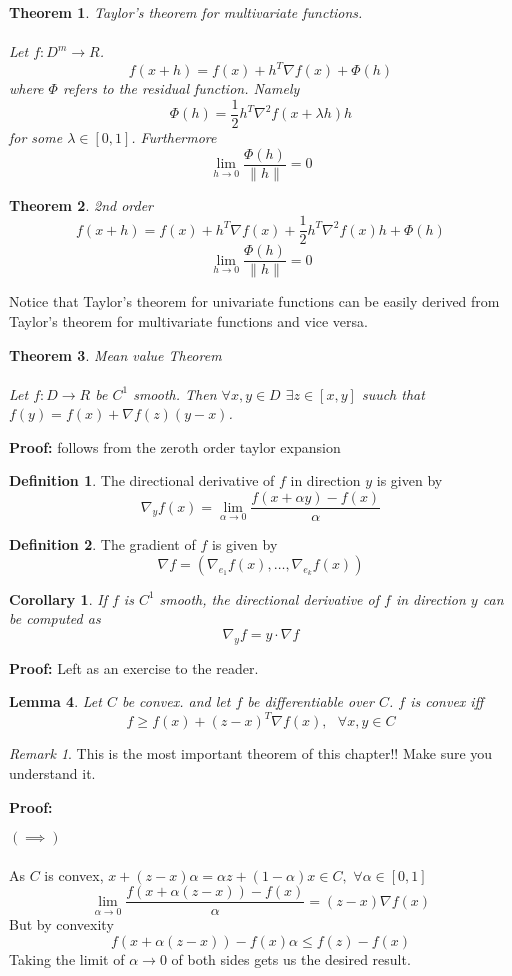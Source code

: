 \documentclass[titlepage]{article}
\theoremstyle{plain}
\newtheorem{thm}{Theorem}[section]
\newtheorem{lem}[thm]{Lemma}
\newtheorem*{cor}{Corollary}
\theoremstyle{definition}
\newtheorem{defn}{Definition}[section]
\theoremstyle{remark}
\newtheorem*{rem}{Remark}
\begin{document}
\begin{thm}
Taylor's theorem for multivariate functions.\\\\ Let $f:D^m \to R$.
\[f(x + h) = f(x) + h^T \nabla f(x) + \Phi(h)\]
where $\Phi$ refers to the residual function. Namely
\[\Phi(h) = \frac{1}{2} h^T \nabla^2 f(x + \lambda h) h\]
for some $\lambda \in [0,1]$. Furthermore
\[\lim_{h \to 0} \frac{\Phi(h)}{\|h\|} = 0\]
\end{thm}
\begin{thm}
2nd order
\[f(x + h) = f(x) + h^T \nabla f(x) + \frac{1}{2} h^T \nabla^2 f(x)h + \Phi(h)\]
\[\lim_{h \to 0} \frac{\Phi(h)}{\|h\|} = 0\]
\end{thm}
Notice that Taylor's theorem for univariate functions can be easily derived from
Taylor's theorem for multivariate functions and vice versa.
\begin{thm} Mean value Theorem\\\\
Let $f : D \to R$ be $C^1$ smooth. Then $\forall x,y \in D$ $\exists z \in
[x,y]$ suuch that $f(y) = f(x) + \nabla f(z)(y - x)$.
\end{thm}
\noindent \textbf{Proof: } follows from the zeroth order taylor expansion
\begin{defn}
The directional derivative of $f$ in direction $y$ is given by
\[\nabla_y f(x) = \lim_{\alpha \to 0} \frac{f(x + \alpha y) - f(x)}{\alpha}\]
\end{defn}
\begin{defn}
The gradient of $f$ is given by
\[\nabla f = (\nabla_{e_1} f(x), \hdots, \nabla_{e_k} f(x))\]
\end{defn}
\begin{cor}
If $f$ is $C^1$ smooth, the directional derivative of $f$ in direction $y$ can be computed as
\[\nabla_y f = y \cdot \nabla f\]
\end{cor}
\noindent \textbf{Proof: } Left as an exercise to the reader.
\begin{lem}
Let $C$ be convex. and let $f$ be differentiable over $C$. $f$ is convex iff
\[f \geq f(x) + (z - x)^T \nabla f(x), \text{ } \forall x,y \in C\]
\end{lem}
\begin{rem}
This is the most important theorem of this chapter!! Make sure you understand
it.
\end{rem}
\noindent \textbf{Proof: }

$(\implies)$ \\\\
As $C$ is convex, $x + (z - x)\alpha = \alpha z  + (1 - \alpha)x \in C,$ $\forall
\alpha \in [0,1]$
\[\lim_{\alpha \to 0} \frac{f(x + \alpha(z - x)) - f(x)}{\alpha} = (z - x)\nabla
f(x)\]
But by convexity
\[{f(x + \alpha(z - x)) - f(x)}{\alpha} \leq f(z) - f(x)\]
Taking the limit of $\alpha \to 0$ of both sides gets us the desired result.\\
\end{document}
